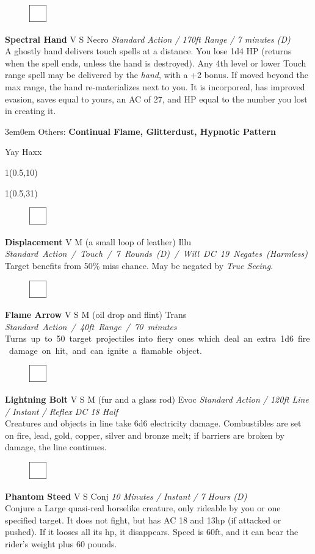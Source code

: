 \documentclass[letterpaper]{article}
\newcommand{\e}[1]{\emph{#1}}
\newcommand{\B}[1]{\textbf{#1}}
\newcommand{\spelllevel}[2]{
\begin{textblock}{1}(0.5,#1)
\begin{sideways}
     {\color{light-gray}{\LARGE \e{#2}}}
\end{sideways}
\end{textblock}}
\newcommand{\spell}[7]{
\begin{figure}
\vspace{-13pt}
\ifstrequal{#2}{Full}{  \includegraphics[width=2em]{Checkbox-Full}}{
\ifstrequal{#2}{Scroll}{\includegraphics[width=2em]{Checkbox-S}}{
                        \includegraphics[width=2em]{Checkbox}}}
\ifstrequal{#7}{}{\vspace{-1em}}{\vspace{#7}}
\end{figure}
 \B{#1} #3 {
    \ifstrequal{#4}{Conj}{\color{Plum}Conj}{%
    \ifstrequal{#4}{Divin}{\color{YellowOrange}Divin}{%
    \ifstrequal{#4}{Ench}{\color{VioletRed}Ench}{%
    \ifstrequal{#4}{Trans}{\color{LimeGreen}Trans}{%
    \ifstrequal{#4}{Evoc}{\color{RedOrange}Evoc}{%
    \ifstrequal{#4}{Illu}{\color{ProcessBlue}Illu}{%
    \ifstrequal{#4}{Abjur}{\color{CadetBlue}Abjur}{%
    \ifstrequal{#4}{Necro}{\color{Red}Necro}{%
}}}}}}}}}
{\footnotesize \e{#5}} \\
#6
}
\begin{document}
\spell{Spectral Hand}{}{V S}{Necro}{\e{Standard Action / 170ft Range / 7 minutes (D)}}{%
A ghostly hand delivers touch spells at a distance.  You lose 1d4 HP (returns when the spell ends, unless the hand is destroyed). Any 4th level or lower Touch range spell may be delivered by the \e{hand}, with a +2 bonus. If moved beyond the max range, the hand re-materializes next to you. It is incorporeal, has improved evasion, saves equal to yours, an AC of 27, and HP equal to the number you lost in creating it.}{1em}\\[-1em] %

\begin{adjustwidth}{3em}{0em}
Others: \B{Continual Flame, Glitterdust, Hypnotic Pattern} \\[-2em]
\end{adjustwidth}

\pagebreak
{\color{White} Yay Haxx}\\[-2em]

\spelllevel{10}{Third: 3/day}
\spelllevel{31}{Fourth: 2/day}

\spell{Displacement}{}{V M (a small loop of leather)}{Illu}{\mbox{Standard Action / Touch / 7 Rounds (D) / Will DC 19 Negates (Harmless)}}{%
Target benefits from 50\% miss chance. May be negated by \e{True Seeing}.}{}\\[-1em] %

\spell{Flame Arrow}{}{V S M (oil drop and flint)}{Trans}{\mbox{Standard Action / 40ft Range / 70 minutes}}{%
\mbox{Turns up to 50 target projectiles into fiery ones which deal an extra 1d6 fire damage on hit, and can ignite a flamable object.}}{}\\[-1em] %

\spell{Lightning Bolt}{}{V S M (fur and a glass rod)}{Evoc}{Standard Action / 120ft Line / Instant / Reflex DC 18 Half}{%
Creatures and objects in line take 6d6 electricity damage. Combustibles are set on fire, lead, gold, copper, silver and bronze melt; if barriers are broken by damage, the line continues.}{} %

\spell{Phantom Steed}{}{V S}{Conj}{10 Minutes / Instant / 7 Hours (D)}{%
Conjure a Large quasi-real horselike creature, only rideable by you or one specified target. It does not fight, but has AC 18 and 13hp (if attacked or pushed).  If it looses all its hp, it disappears.  Speed is 60ft, and it can bear the rider's weight plus 60 pounds.}{1em}\\[-1em] %
\end{document}
